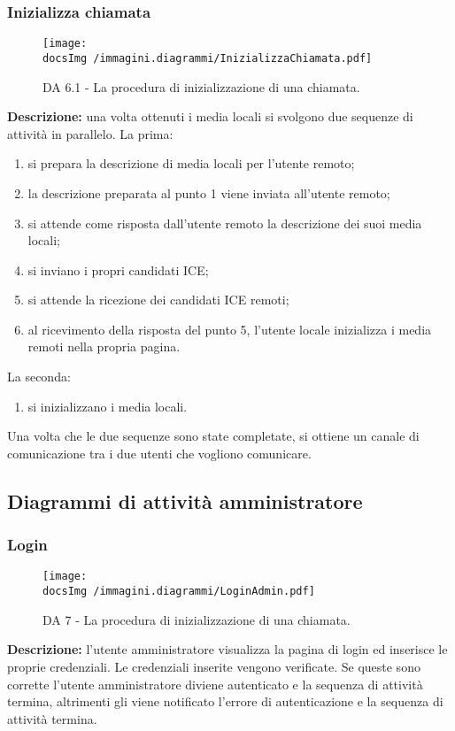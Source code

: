 		\subsubsection{Inizializza chiamata}
		\begin{center}
			\begin{figure}[htbp]
				\centering
				\texttt{[image: \\docsImg /immagini.diagrammi/InizializzaChiamata.pdf]}
			\caption{DA 6.1 - La procedura di inizializzazione di una chiamata.}	
			\end{figure}
		\end{center}
		\noindent \textbf{Descrizione: }una volta ottenuti i media locali si svolgono due sequenze di attività in parallelo. La prima:
		\begin{enumerate}
			\item si prepara la descrizione di media locali per l'utente remoto;
			\item la descrizione preparata al punto 1 viene inviata all'utente remoto;
			\item si attende come risposta dall'utente remoto la descrizione dei suoi media locali;
			\item si inviano i propri candidati ICE;
			\item si attende la ricezione dei candidati ICE remoti;
			\item al ricevimento della risposta del punto 5, l'utente locale inizializza i media remoti nella propria pagina.
		\end{enumerate}
		La seconda:
		\begin{enumerate}
			\item si inizializzano i media locali.
		\end{enumerate}
		Una volta che le due sequenze sono state completate, si ottiene un canale di comunicazione tra i due utenti che vogliono comunicare.

		
		
		
	\subsection{Diagrammi di attività amministratore}
	
		\subsubsection{Login}
		\begin{center}
			\begin{figure}[htbp]
				\centering
				\texttt{[image: \\docsImg /immagini.diagrammi/LoginAdmin.pdf]}
			\caption{DA 7 - La procedura di inizializzazione di una chiamata.}	
			\end{figure}
		\end{center}
		\noindent \textbf{Descrizione: }l'utente amministratore visualizza la pagina di login ed inserisce le proprie credenziali. Le credenziali inserite vengono verificate. Se queste sono corrette l'utente amministratore diviene autenticato e la sequenza di attività termina, altrimenti gli viene notificato l'errore di autenticazione e la sequenza di attività termina.
		\newpage
		
